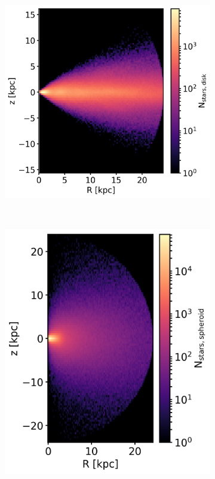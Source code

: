 \begin{figure}[htbp]
\captionsetup{format=plain}
    \centering
    \begin{subfigure}[c]{0.45\textwidth}
    \centering
    \includegraphics[height=0.25\textheight]{plots/Auriga/disk_selection_Rz_snap_127.png}    	
    \end{subfigure}
    ~ %
    \begin{subfigure}[c]{0.45\textwidth}
    \centering
    \includegraphics[height=0.25\textheight]{plots/Auriga/spheroid_selection_Rz_snap_127.png}

\end{subfigure}
\end{figure}
